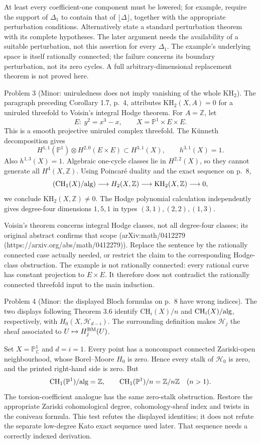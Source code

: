 \documentclass[10pt]{article}
\begin{document}
At least every coefficient-one component must be lowered; for example, require the support of \(\Delta_1\) to contain that of \(\lfloor\Delta\rfloor\), together with the appropriate perturbation conditions. Alternatively state a standard perturbation theorem with its complete hypotheses. The later argument needs the availability of a suitable perturbation, not this assertion for every \(\Delta_1\). The example’s underlying space is itself rationally connected; the failure concerns its boundary perturbation, not its zero cycles. A full arbitrary-dimensional replacement theorem is not proved here.\par
Problem 3 (Minor: uniruledness does not imply vanishing of the whole \(\mathrm{KH}_2\)).  The paragraph preceding Corollary 1.7, p. 4, attributes \(\mathrm{KH}_2(X,A)=0\) for a uniruled threefold to Voisin’s integral Hodge theorem. For \(A=\mathbb Z\), let \[E:\ y^2=x^3-x,\qquad X=\mathbb P^1\times E\times E.\] This is a smooth projective uniruled complex threefold. The Künneth decomposition gives \[H^{1,1}(\mathbb P^1)\otimes H^{2,0}(E\times E)
 \subset H^{3,1}(X),\qquad h^{3,1}(X)=1.\] Also \(h^{1,3}(X)=1\). Algebraic one-cycle classes lie in \(H^{2,2}(X)\), so they cannot generate all \(H^4(X,\mathbb Z)\). Using Poincaré duality and the exact sequence on p. 8, \[(\mathrm{CH}_1(X)/{\rm alg})\longrightarrow H_2(X,\mathbb Z)
 \longrightarrow\mathrm{KH}_2(X,\mathbb Z)\longrightarrow0,\] we conclude \(\mathrm{KH}_2(X,\mathbb Z)\ne0\). The Hodge polynomial calculation independently gives degree-four dimensions \(1,5,1\) in types \((3,1),(2,2),(1,3)\).\par
Voisin’s theorem concerns integral Hodge classes, not all degree-four classes; its original abstract confirms that scope (arXiv:math/0412279 (https://arxiv.org/abs/math/0412279)). Replace the sentence by the rationally connected case actually needed, or restrict the claim to the corresponding Hodge-class obstruction. The example is not rationally connected: every rational curve has constant projection to \(E\times E\). It therefore does not contradict the rationally connected threefold input to the main induction.\par
Problem 4 (Minor: the displayed Bloch formulas on p. 8 have wrong indices).  The two displays following Theorem 3.6 identify \(\mathrm{CH}_i(X)/n\) and \(\mathrm{CH}_i(X)/{\rm alg}\), respectively, with \(H_0(X,\mathcal H_{d-i})\). The surrounding definition makes \(\mathcal H_j\) the sheaf associated to \(U\mapsto H_j^{\rm BM}(U)\).\par
Set \(X=\mathbb P^1_{\mathbb C}\) and \(d=i=1\). Every point has a noncompact connected Zariski-open neighbourhood, whose Borel–Moore \(H_0\) is zero. Hence every stalk of \(\mathcal H_0\) is zero, and the printed right-hand side is zero. But \[\mathrm{CH}_1(\mathbb P^1)/{\rm alg}=\mathbb Z,\qquad
 \mathrm{CH}_1(\mathbb P^1)/n=\mathbb Z/n\mathbb Z\quad(n>1).\] The torsion-coefficient analogue has the same zero-stalk obstruction. Restore the appropriate Zariski cohomological degree, cohomology-sheaf index and twists in the coniveau formula. This test refutes the displayed identities; it does not refute the separate low-degree Kato exact sequence used later. That sequence needs a correctly indexed derivation.\par
\end{document}
